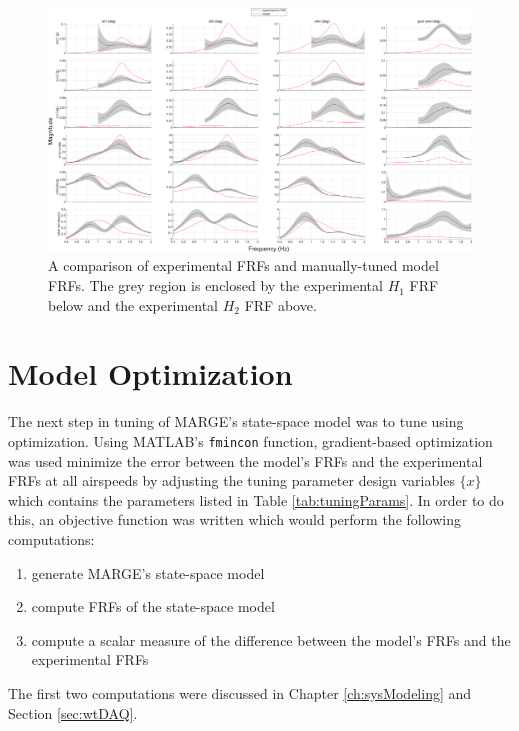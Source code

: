 \begin{landscape}

\begin{figure}[H]
	\centering
	\includegraphics[width=9in]{figs/FRFcompare_manualTune_q207.png}
	\caption{A comparison of experimental FRFs and manually-tuned model FRFs. The grey region is enclosed by the experimental $H_1$ FRF below and the experimental $H_2$ FRF above.}
	\label{fig:manualTunedFRF}
\end{figure}

\end{landscape}

\section{Model Optimization} %

The next step in tuning of MARGE's state-space model was to tune using optimization. Using MATLAB's \verb|fmincon| function, gradient-based optimization was used minimize the error between the model's FRFs and the experimental FRFs at all airspeeds by adjusting the tuning parameter design variables $\{x\}$ which contains the parameters listed in Table \ref{tab:tuningParams}. In order to do this, an objective function was written which would perform the following computations:
\begin{enumerate}
	\item generate MARGE's state-space model
	\item compute FRFs of the state-space model
	\item compute a scalar measure of the difference between the model's FRFs and the experimental FRFs
\end{enumerate}
The first two computations were discussed in Chapter \ref{ch:sysModeling} and Section \ref{sec:wtDAQ}.


